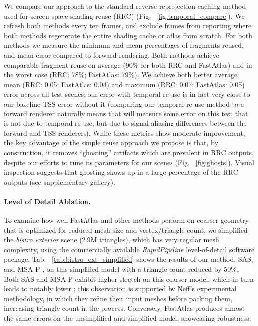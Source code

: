 We compare our approach to the standard reverse reprojection caching method used for screen-space shading reuse (RRC)  \cite{nehab2007accelerating} (Fig. ~\ref{fig:temporal_compare}). We refresh both methods every ten frames, and exclude frames from reporting where both methods regenerate the entire shading cache or atlas from scratch.  
For both methods we measure the minimum and mean percentages of fragments reused, and mean \FLIP error compared to forward rendering. Both methods achieve comparable fragment reuse on average (90\% for both RRC and FastAtlas) and in the worst case (RRC: 78\%; FastAtlas: 79\%).  We achieve both better average mean \FLIP (RRC: 0.05; FastAtlas: 0.04) and maximum (RRC: 0.07; FastAtlas: 0.05) error across all test scenes; our error with temporal re-use is in fact very close to our baseline TSS error without it (comparing our temporal re-use method to a forward renderer naturally means that \FLIP will measure some error on this test that is not due to temporal re-use, but due to signal aliasing differences between the forward and TSS renderers). While these metrics show moderate improvement, the key advantage of the simple reuse approach we propose is that, by construction, it removes ``ghosting'' artifacts which are prevalent 
in RRC outputs, despite our efforts to tune its parameters for our scenes (Fig. ~\ref{fig:ghosts}). Visual inspection suggests that ghosting shows up in a large percentage of the RRC outputs (see supplementary gallery).



\paragraph*{Level of Detail Ablation.} To examine how well FastAtlas and other methods perform on coarser geometry that is optimized for reduced mesh size and vertex/triangle count, we simplified the {\em bistro exterior} scene (2.9M triangles), which has very regular mesh complexity, using the commercially available {\em RapidPipeline} level-of-detail software package. Tab. ~\ref{tab:bistro_ext_simplified} shows the results of our method, SAS, and MSA-P \cite{Neff2022MSA}, on this simplified model with a triangle count reduced by 50\%. Both SAS and MSA-P exhibit higher stretch on this coarser model, which in turn leads to notably lower \FLIP; this observation is supported by Neff's experimental methodology, in which they refine their input meshes before packing them, increasing triangle count in the process. Conversely, FastAtlas produces almost the same \FLIP errors on the unsimplified and simplified model, showcasing robustness.

